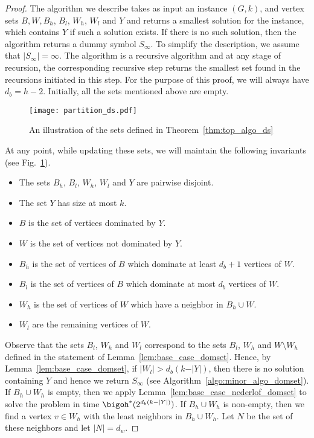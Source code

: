 \begin{proof}

The algorithm we describe takes as input an instance $(G,k)$, and vertex sets $B,W, B_h$, $B_l$, $W_h$, $W_l$ and $Y$ and returns a smallest solution for the instance, which contains $Y$ if such a solution exists. If there is no such solution, then the algorithm returns a dummy symbol $S_\infty$. To simplify the description, we assume that $|S_\infty| = \infty $. The algorithm is a recursive algorithm and at any stage of recursion, the corresponding recursive step returns the smallest set found in the recursions initiated in this step.
For the purpose of this proof, we will always have $d_b=h-2$.  Initially, all the sets mentioned above are empty. 




\begin{figure}[t]
\centering
\texttt{[image: partition\_ds.pdf]}
\caption{An illustration of the sets defined in Theorem~\ref{thm:top_algo_ds}}
\label{fig:partition_domset}
\end{figure}



\noindent
At any point, while updating these sets, we will maintain the following invariants (see Fig.~\ref{fig:partition_domset}).
\begin{itemize}
\item The sets $B_h$, $B_l$, $W_h$, $W_l$ and $Y$ are pairwise disjoint.
\item The set $Y$ has size at most $k$.
\item $B$ is the set of vertices dominated by $Y$.
\item $W$ is the set of vertices not dominated by $Y$.
\item $B_h$ is the set of vertices of $B$ which dominate at least $d_b+1$ vertices of $W$.
\item $B_l$ is the set of vertices of $B$ which dominate at most $d_b$ vertices of $W$.
\item $W_h$ is the set of vertices of $W$ which have a neighbor in $B_h\cup W$.
\item $W_l$ are the remaining vertices of $W$.
\end{itemize}



\noindent

Observe that the sets $B_l$, $W_h$ and $W_l$ correspond to the sets $B_l$, $W_h$ and $W\setminus W_h$ defined in the statement of Lemma~\ref{lem:base_case_domset}. 
Hence, by Lemma~\ref{lem:base_case_domset}, if $\vert W_l\vert>d_b(k-\vert Y\vert)$, then there is no solution containing $Y$ and hence we return $S_\infty$ (see Algorithm~\ref{algo:minor_algo_domset}). 
If $B_h\cup W_h$ is empty, then we apply Lemma~\ref{lem:base_case_nederlof_domset} to solve the problem in time $\bigoh^*(2^{d_b (k-|Y|)})$. If $B_h\cup W_h$ is non-empty, then we find a vertex $v\in W_h$ with the least neighbors in $B_h\cup W_h$. Let $N$ be the set of these neighbors and let $\vert N\vert=d_w$. 


\end{proof}
